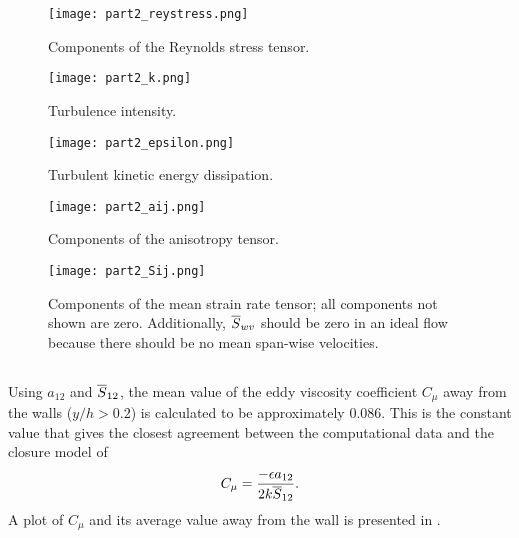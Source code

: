 \documentclass[11pt]{article}
\begin{document}
\begin{figure}[p]
\centering
\texttt{[image: part2\_reystress.png]}
\vspace{6pt}
\caption{Components of the Reynolds stress tensor.}
\label{fig:part2_reystress}
\end{figure}

\begin{figure}[p]
\centering
\texttt{[image: part2\_k.png]}
\vspace{6pt}
\caption{Turbulence intensity.}
\label{fig:part2_k}
\end{figure}

\begin{figure}[p]
\centering
\texttt{[image: part2\_epsilon.png]}
\vspace{6pt}
\caption{Turbulent kinetic energy dissipation.}
\label{fig:part2_epsilon}
\end{figure}

\begin{figure}[p]
\centering
\texttt{[image: part2\_aij.png]}
\vspace{6pt}
\caption{Components of the anisotropy tensor.}
\label{fig:part2_aij}
\end{figure}

\begin{figure}[p]
\centering
\texttt{[image: part2\_Sij.png]}
\vspace{6pt}
\caption{Components of the mean strain rate tensor; all components not shown are zero. Additionally, $\overline{S}_{wv}$ should be zero in an ideal flow because there should be no mean span-wise velocities.}
\label{fig:part2_Sij}
\end{figure}

\subsection{}

Using $a_{12}$ and $\overline{S}_{12}$, the mean value of the eddy viscosity coefficient $C_\mu$ away from the walls ($y/h > 0.2$) is calculated to be approximately 0.086. This is the constant value that gives the closest agreement between the computational data and the closure model of
\begin{equation}
C_\mu =
\frac{-\epsilon a_{12}}{2k \overline{S}_{12}}
.
\end{equation}
A plot of $C_\mu$ and its average value away from the wall is presented in .
\end{document}
